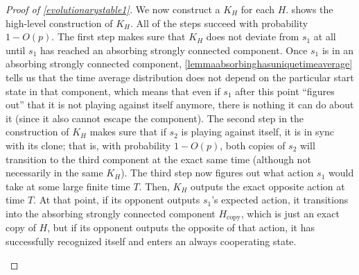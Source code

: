\documentclass[11pt]{amsart}
\theoremstyle{definition}
\theoremstyle{remark}
\begin{document}
\begin{proof}[Proof of \cref{evolutionarystable1}]
      We now construct a $K_H$ for each $H$.  shows the high-level construction of $K_H$.
       All of the steps succeed with probability $1 - O(p)$. The first step makes sure that $K_H$ does not deviate from $s_1$ at all
        until $s_1$ has reached an absorbing strongly connected component. 
       Once $s_1$ is in an absorbing strongly connected component, \cref{lemmaabsorbinghasuniquetimeaverage} tells us that the time average distribution does not depend on the particular start state in that component, which means that even if $s_1$ after this point ``figures out'' that it is not playing against itself anymore, there is nothing it can do about it (since it also cannot escape the component). 
      The second step in the construction of $K_H$ makes sure that if $s_2$ is playing against itself, it is in sync with its clone; that is, with probability $1 - O(p)$, both copies of $s_2$ will transition to the third component at the exact same time (although not necessarily in the same $K_H$). 
      The third step now figures out what action $s_1$ would take at some large finite time $T$. 
      Then, $K_H$ outputs the exact opposite action at time $T$. 
      At that point, if its opponent outputs $s_1$'s expected action, it transitions into the absorbing strongly connected component $H_\text{copy}$, which is just an exact copy of $H$, but if its opponent outputs the opposite of that action, it has successfully recognized itself and enters an always cooperating state.

      \begin{figure}
        \centering
\end{figure}
\end{proof}
\end{document}
